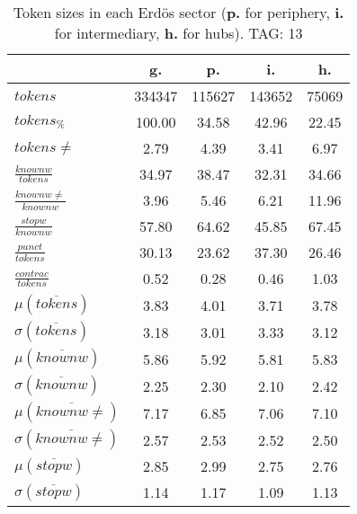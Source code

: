 \begin{table}[h!]
\begin{center}
\begin{tabular}{| l || c | c | c | c |}\hline
 & {\bf g.} & {\bf p.} & {\bf i.} & {\bf h.} \\\hline\hline
$tokens$ & 334347  & 115627  & 143652  & 75069 \\
$tokens_{\%}$ & 100.00  & 34.58  & 42.96  & 22.45 \\
$tokens \neq$ & 2.79  & 4.39  & 3.41  & 6.97 \\\hline
$\frac{knownw}{tokens}$ & 34.97  & 38.47  & 32.31  & 34.66 \\
$\frac{knownw \neq}{knownw}$ & 3.96  & 5.46  & 6.21  & 11.96 \\\hline
$\frac{stopw}{knownw}$ & 57.80  & 64.62  & 45.85  & 67.45 \\
$\frac{punct}{tokens}$ & 30.13  & 23.62  & 37.30  & 26.46 \\
$\frac{contrac}{tokens}$ & 0.52  & 0.28  & 0.46  & 1.03 \\\hline\hline
$\mu(\overline{tokens})$ & 3.83  & 4.01  & 3.71  & 3.78 \\
$\sigma(\overline{tokens})$ & 3.18  & 3.01  & 3.33  & 3.12 \\\hline
$\mu(\overline{knownw})$ & 5.86  & 5.92  & 5.81  & 5.83 \\
$\sigma(\overline{knownw})$ & 2.25  & 2.30  & 2.10  & 2.42 \\\hline
$\mu(\overline{knownw \neq})$ & 7.17  & 6.85  & 7.06  & 7.10 \\
$\sigma(\overline{knownw \neq})$ & 2.57  & 2.53  & 2.52  & 2.50 \\\hline
$\mu(\overline{stopw})$ & 2.85  & 2.99  & 2.75  & 2.76 \\
$\sigma(\overline{stopw})$ & 1.14  & 1.17  & 1.09  & 1.13 \\\hline
\end{tabular}
\caption{Token sizes in each Erd\"os sector ({{\bf p.}} for periphery, {{\bf i.}} for intermediary, {{\bf h.}} for hubs). TAG: 13}
\end{center}
\end{table}
